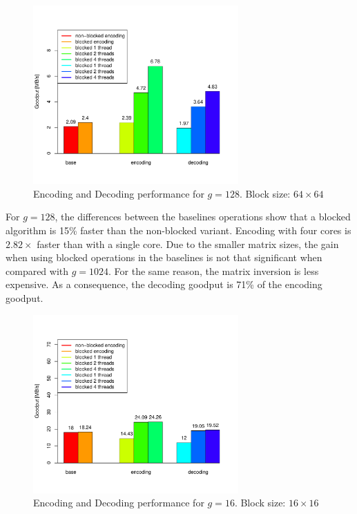\begin{figure}[ht!]
\centering
\includegraphics[width=0.7\textwidth]{images/2015-04-18_encoding_decoding_128.pdf}
\caption{Encoding and Decoding performance for $g = 128$. Block size: $64 \times 64$ \cite{wunderlich2015network}}
\label{enc_dec128}
\end{figure}

For $g = 128$, the differences between the baselines operations show that a
blocked algorithm is 15\% faster than the non-blocked variant. Encoding with
four cores is $2.82\times$ faster than with a single core. Due to the smaller
matrix sizes, the gain when using blocked operations in the baselines is not
that significant when compared with $g = 1024$. For the same reason, the matrix
inversion is less expensive. As a consequence, the decoding goodput is 71\%
of the encoding goodput.

\begin{figure}[ht!]
\centering
\includegraphics[width=0.7\textwidth]{images/2015-04-18_encoding_decoding_16.pdf}
\caption{Encoding and Decoding performance for $g = 16$. Block size: $16 \times 16$ \cite{wunderlich2015network}}
\label{enc_dec16}
\end{figure}

